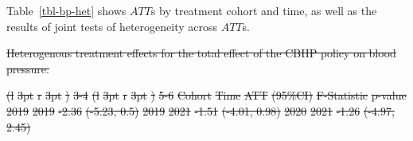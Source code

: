 \documentclass[
  letterpaper,
  DIV=11,
  numbers=noendperiod]{scrartcl}
\makeatletter
\renewenvironment{table}%
   {\renewcommand\familydefault\sfdefault
    \@float{table}}
   {\end@float}
\providecommand{\DIFdel}[1]{{\protect\color{red}\sout{#1}}}                      %
\providecommand{\DIFdelbegin}{} %
\providecommand{\DIFdelFL}[1]{\DIFdel{#1}} %
\newcommand{\DIFscaledelfig}{0.5}
\newlength{\DIFdelgraphicswidth} %
\newlength{\DIFdelgraphicsheight} %
\newcommand{\DIFdelincludegraphics}[2][]{%
\sbox{\DIFdelgraphicsbox}{\DIFOincludegraphics[#1]{#2}}%
\settoboxwidth{\DIFdelgraphicswidth}{\DIFdelgraphicsbox} %
\settoboxtotalheight{\DIFdelgraphicsheight}{\DIFdelgraphicsbox} %
\scalebox{\DIFscaledelfig}{%
\parbox[b]{\DIFdelgraphicswidth}{\usebox{\DIFdelgraphicsbox}\\[-\baselineskip] \rule{\DIFdelgraphicswidth}{0em}}\llap{\resizebox{\DIFdelgraphicswidth}{\DIFdelgraphicsheight}{%
\setlength{\unitlength}{\DIFdelgraphicswidth}%
\begin{picture}(1,1)%
\thicklines\linethickness{2pt} %
{\color[rgb]{1,0,0}\put(0,0){\framebox(1,1){}}}%
{\color[rgb]{1,0,0}\put(0,0){\line( 1,1){1}}}%
{\color[rgb]{1,0,0}\put(0,1){\line(1,-1){1}}}%
\end{picture}%
}\hspace*{3pt}}} %
} %
\DeclareRobustCommand{\DIFdelbegin}{\DIFOdelbegin \let\includegraphics\DIFdelincludegraphics} %
\makeatother
\begin{document}
Table~\ref{tbl-bp-het} shows \(ATT\)s by treatment cohort and time, as
well as the results of joint tests of heterogeneity across \(ATT\)s.

\DIFdelbegin %
{%
\DIFdelFL{Heterogenous treatment effects for the total effect of the CBHP policy
on blood pressure. }}%

\DIFdelFL{(l}%
\DIFdelFL{3pt}%
\DIFdelFL{r}%
\DIFdelFL{3pt}%
\DIFdelFL{)}%
\DIFdelFL{3-4}%
\DIFdelFL{(l}%
\DIFdelFL{3pt}%
\DIFdelFL{r}%
\DIFdelFL{3pt}%
\DIFdelFL{)}%
\DIFdelFL{5-6}%
\DIFdelFL{Cohort }%
\DIFdelFL{Time }%
\DIFdelFL{ATT }%
\DIFdelFL{(95\%CI) }%
\DIFdelFL{F-Statistic }%
\DIFdelFL{p-value}%
\DIFdelFL{\hspace{1em}2019 }%
\DIFdelFL{2019 }%
\DIFdelFL{-2.36 }%
\DIFdelFL{(-5.23, 0.5) }%
\DIFdelFL{\hspace{1em}2019 }%
\DIFdelFL{2021 }%
\DIFdelFL{-1.51 }%
\DIFdelFL{(-4.01, 0.98) }%
\DIFdelFL{\hspace{1em}2020 }%
\DIFdelFL{2021 }%
\DIFdelFL{-1.26 }%
\DIFdelFL{(-4.97, 2.45) }%
\end{document}
